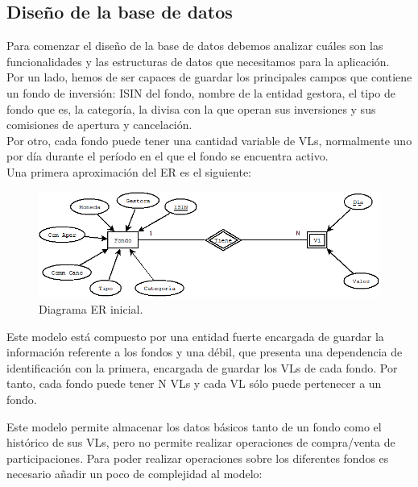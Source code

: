 \documentclass[12pt, a4paper]{article}
\begin{document}
\subsection{Diseño de la base de datos}
Para comenzar el diseño de la base de datos debemos analizar cuáles son las funcionalidades y las estructuras de datos que necesitamos para la aplicación.\\

Por un lado, hemos de ser capaces de guardar los principales campos que contiene un fondo de inversión: \gls{ISIN} del fondo, nombre de la entidad gestora, el tipo de fondo que es, la categoría, la divisa con la que operan sus inversiones y sus comisiones de apertura y cancelación.\\

Por otro, cada fondo puede tener una cantidad variable de \gls{VL}s, normalmente uno por día durante el período en el que el fondo se encuentra activo.\\

Una primera aproximación del \gls{ER} es el siguiente:\\



\begin{figure}[htbp]
	\centering
	\includegraphics[width=\textwidth]{figuras/ERSimple.png}
	\caption{Diagrama ER inicial.}
	\label{fig:erinicial}
\end {figure}

Este modelo está compuesto por una entidad fuerte encargada de guardar la información referente a los fondos y una débil, que presenta una dependencia de identificación con la primera, encargada de guardar los \gls{VL}s de cada fondo. Por tanto, cada fondo puede tener N \gls{VL}s y cada \gls{VL} sólo puede pertenecer a un fondo.

\newpage

Este modelo permite almacenar los datos básicos tanto de un fondo como el histórico de sus \gls{VL}s, pero no permite realizar operaciones de compra/venta de participaciones. Para poder realizar operaciones sobre los diferentes fondos es necesario añadir un poco de complejidad al modelo:
\end{document}
